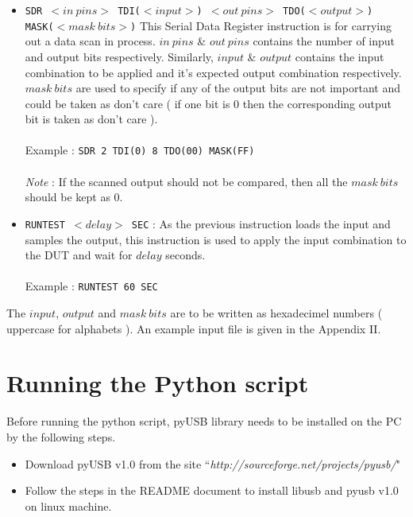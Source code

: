 \documentclass[a4paper,11pt]{article}
\begin{document}
\begin{itemize}
 \item \texttt{SDR $<in\:pins>$ TDI($<input>$) $<out\:pins>$ TDO($<output>$) MASK($<mask\:bits>$)}
	\vspace*{0.3cm}
	\newline This Serial Data Register instruction is for carrying out a data scan in process. $in\:pins$ \& $out\:pins$ contains the number of input and output bits respectively. Similarly, $input$ \& $output$ contains the input combination to be applied and it's expected output combination respectively. $mask\:bits$ are used to specify if any of the output bits are not important and could be taken as don't care ( if one bit is 0 then the corresponding output bit is taken as don't care ).\\\\
Example : \texttt{SDR 2 TDI(0) 8 TDO(00) MASK(FF)}
\\\\
\textit{Note} : If the scanned output should not be compared, then all the $mask\:bits$ should be kept as 0.
 \item \texttt{RUNTEST $<delay>$ SEC} :
	\vspace*{0.3cm}
	\newline As the previous instruction loads the input and samples the output, this instruction is used to apply the input combination to the DUT and wait for $delay$ seconds.\\\\
Example : \texttt{RUNTEST 60 SEC}
\end{itemize}

The $input$, $output$ and $mask\:bits$ are to be written as hexadecimel numbers ( uppercase for alphabets ). An example input file is given in the Appendix II.

\section{Running the Python script}
Before running the python script, pyUSB\cite{pyUSB} library needs to be installed on the PC by the following steps.

\begin{itemize}
\item Download pyUSB v1.0 from the site ``\textit{http://sourceforge.net/projects/pyusb/}"
\item Follow the steps in the README document to install libusb and pyusb v1.0 on linux machine.
\end{itemize}
\end{document}

